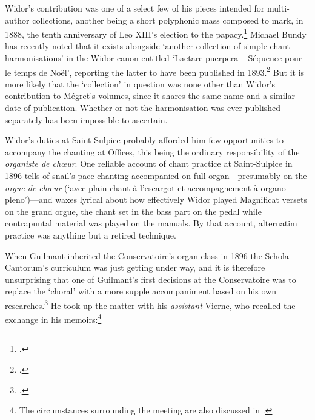 \label{sc:widor_megret}%
Widor's contribution was one of a select few of his pieces intended for multi-author collections, another being a short polyphonic mass composed to mark, in 1888, the tenth anniversary of Leo XIII's election to the papacy.\footcite[`Avis des éditeurs' and pp.~15--16]{GrivetLitaniessaintevierge1888}
Michael Bundy has recently noted that it exists alongside `another collection of simple chant harmonisations' in the Widor canon entitled `Laetare puerpera -- Séquence pour le temps de Noël', reporting the latter to have been published in 1893.\footcite[86--7]{BundyVisionsEternityChoral2017}
But it is more likely that the `collection' in question was none other than Widor's contribution to Mégret's volumes, since it shares the same name and a similar date of publication.
Whether or not the harmonisation was ever published separately has been impossible to ascertain.

%
Widor's duties at Saint-Sulpice probably afforded him few opportunities to accompany the chanting at Offices, this being the ordinary responsibility of the \emph{organiste de chœur}.
One reliable account of chant practice at Saint-Sulpice in 1896 tells of snail's-pace chanting accompanied on full organ---presumably on the \emph{orgue de chœur} (`avec plain-chant à l'escargot et accompagnement à organo pleno')---and waxes lyrical about how effectively Widor played Magnificat versets on the grand orgue, the chant set in the bass part on the pedal while contrapuntal material was played on the manuals.
By that account, alternatim practice was anything but a retired technique.
%

\pagebreak{}
When Guilmant inherited the Conservatoire's organ class in 1896 the Schola Cantorum's curriculum was just getting under way, and it is therefore unsurprising that one of Guilmant's first decisions at the Conservatoire was to replace the `choral' with a more supple accompaniment based on his own researches.\footcite[For the events leading to Widor's succession, see][116]{OchseOrganistsOrganPlaying2000}
He took up the matter with his \emph{assistant} Vierne, who recalled the exchange in his memoirs:\footnote{The circumstances surrounding the meeting are also discussed in \cite[362]{Lessmannanachronismemusicalaccompagnement2019}.}

